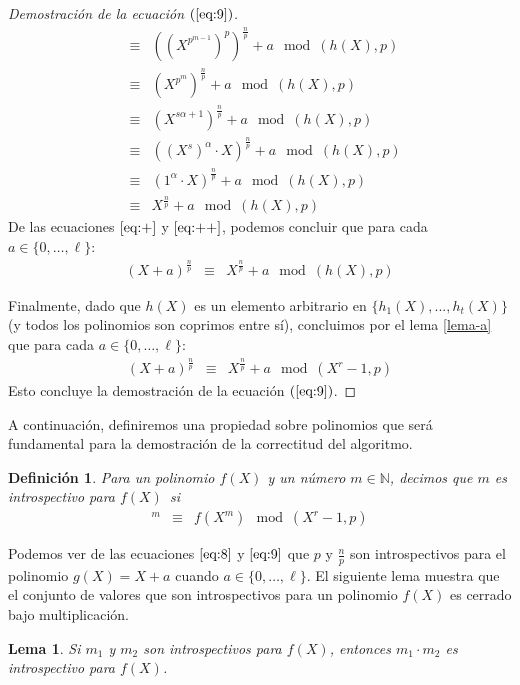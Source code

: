\documentclass[10pt]{article}
\newcommand{\0}{\mathbf{0}}
\newcommand{\1}{\mathbf{1}}
\newcommand{\modulop}{\mod (X^r-1,p)}
\newcommand{\modulops}{\!\!\mod (X^r-1,p)}
\newcommand{\modulohps}{\!\!\mod (h(X),p)}
\newcommand{\+}{\oplus}
\newcommand{\comentario}[1]{}
\newcommand{\comentarioin}[1]{}
\newtheorem{lemma}[theorem]{Lema}
\newtheorem{definition}[theorem]{Definición}
\theoremstyle{remark}
\theoremstyle{remark}
\begin{document}
\begin{proof}[Demostración de la ecuación $(\ref{eq:9})$]
\begin{eqnarray}
		    & \equiv &((X^{p^{m-1}})^p)^{\frac{n}{p}} + a\modulohps\nonumber\\
		    & \equiv &(X^{p^{m}})^{\frac{n}{p}} + a\modulohps\nonumber\\
		    & \equiv &(X^{s\alpha+1})^{\frac{n}{p}} + a\modulohps\nonumber\\
		    & \equiv &((X^{s})^{\alpha}\cdot X)^{\frac{n}{p}} + a\modulohps\nonumber\\
		    & \equiv &(1^{\alpha}\cdot X)^{\frac{n}{p}} + a\modulohps\nonumber\\
		    & \equiv & X^{\frac{n}{p}} + a\modulohps\label{eq:++}
		\end{eqnarray}
		De las ecuaciones $\eqref{eq:+}$ y $\eqref{eq:++}$, podemos concluir que para cada $a \in \{0, \ldots, \ell\}$:
		\begin{eqnarray*}
		    (X+a)^{\frac{n}{p}}&\equiv &X^{\frac{n}{p}} + a\modulohps
		\end{eqnarray*}
		
		Finalmente, dado que $h(X)$ es un elemento arbitrario en $\{h_1(X),...,h_t(X)\}$ (y todos los polinomios son coprimos entre sí), concluimos por el lema \ref{lema-a} que para cada $a \in \{0, \ldots, \ell\}$:
		\begin{eqnarray*}
		    (X+a)^{\frac{n}{p}}&\equiv &X^{\frac{n}{p}} + a\modulops
		\end{eqnarray*}
		Esto concluye la demostración de la ecuación $(\ref{eq:9})$.
	\end{proof}		
	A continuación, definiremos una propiedad sobre polinomios que será fundamental para la demostración de la correctitud del algoritmo.
	\begin{definition}
	Para un polinomio $f(X)$ y un número $m\in \mathbb{N}$, decimos que $m$ es introspectivo para $f(X)$~si
	\begin{eqnarray*}
	[f(X)]^m & \equiv & f(X^m) \modulop
	\end{eqnarray*}
	\end{definition}
Podemos ver de las ecuaciones $\eqref{eq:8}$ y $\eqref{eq:9}$ que $p$
y $\frac{n}{p}$ son introspectivos para el polinomio $g(X) = X+a$
cuando $a \in \{0, \ldots, \ell\}$.  El siguiente lema muestra que el
conjunto de valores que son introspectivos para un polinomio $f(X)$ es
cerrado bajo multiplicación.
	\begin{lemma}\label{lema-4.7}
		Si $m_1$ y $m_2$ son introspectivos para $f(X)$, entonces $m_1\cdot m_2$ es introspectivo para $f(X)$.
	\end{lemma}
\end{document}
